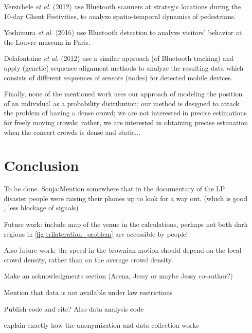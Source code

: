 \documentclass[10pt,a4paper]{article}
\begin{document}
Versichele \textit{et al.} (2012) \cite{versichele:1} use Bluetooth scanners at strategic locations during the 10-day Ghent Festivities, to analyze spatio-temporal dynamics of pedestrians. 

Yoshimura \textit{et al.} (2016) \cite{yoshimura:1} use Bluetooth detection to analyze visitors' behavior at the Louvre museum in Paris.

Delafontaine \textit{et al.} (2012) \cite{delafontaine:1} use a similar approach (of Bluetooth tracking) and apply (genetic) sequence alignment methods to analyze the resulting data which consists of different sequences of sensors (nodes) for detected mobile devices.




Finally, none of the mentioned work uses our approach of modeling the position of an individual as a probability distribution; our method is designed to attack the problem of having a dense crowd; we are not interested in precise estimations for freely moving crowds; rather, we are interested in obtaining precise estimation when the  concert crowds is dense and static...


\section{Conclusion}\label{sec:conclusion}
To be done. 
Sonja:Mention somewhere that in the documentary of the LP disaster people were raising their phones up to look for a way out. (which is good , less blockage of signals)




Future work: include map of the venue in the calculations, perhaps not both dark  regions in \ref{fig:trilateration_problem} are accessible by people!

Also future work: the speed in the brownian motion should depend on the local crowd density, rather than on the average crowd density.

Make an acknowledgments section (Arena, Jessy or maybe Jessy co-author?)

Mention that data is not available under law restrictions

Publish code and cite?
Also data analysis code

explain exactly how the anonymization and data collection works



\end{document}
